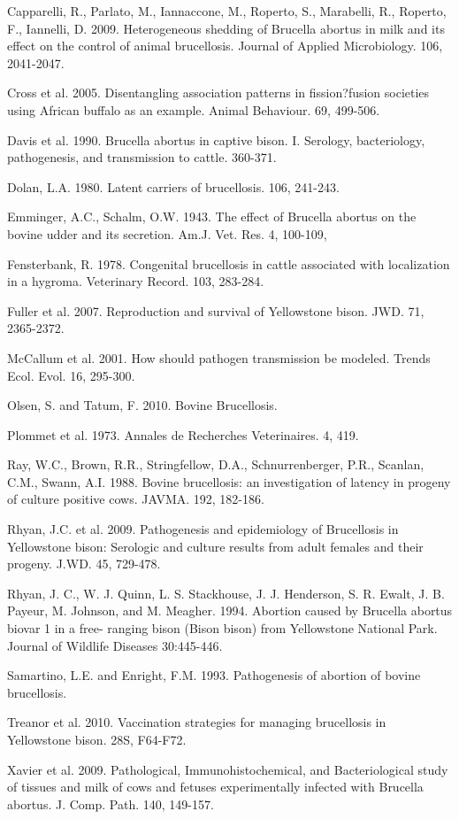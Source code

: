 \documentclass[letterpaper,12pt]{article}
\begin{document}
Capparelli, R., Parlato, M., Iannaccone, M., Roperto, S., Marabelli, R., Roperto, F., Iannelli, D. 2009. Heterogeneous shedding of Brucella abortus in milk and its effect on the control of animal brucellosis. Journal of Applied Microbiology. 106, 2041-2047.

Cross et al. 2005. Disentangling association patterns in fission?fusion societies using African buffalo as an example. Animal Behaviour. 69, 499-506.

Davis et al. 1990. Brucella abortus in captive bison. I. Serology, bacteriology, pathogenesis, and transmission to cattle. 360-371.

Dolan, L.A. 1980. Latent carriers of brucellosis. 106, 241-243. 

Emminger, A.C., Schalm, O.W. 1943. The effect of Brucella abortus on the bovine udder and its secretion. Am.J. Vet. Res. 4, 100-109, 

Fensterbank, R. 1978. Congenital brucellosis in cattle associated with localization in a hygroma. Veterinary Record. 103, 283-284.

Fuller et al. 2007. Reproduction and survival of Yellowstone bison. JWD. 71, 2365-2372.

McCallum et al. 2001. How should pathogen transmission be modeled. Trends Ecol. Evol. 16, 295-300.

Olsen, S. and Tatum, F. 2010. Bovine Brucellosis.

Plommet et al. 1973. Annales de Recherches Veterinaires. 4, 419. %

Ray, W.C., Brown, R.R., Stringfellow, D.A., Schnurrenberger, P.R., Scanlan, C.M., Swann, A.I. 1988. Bovine brucellosis: an investigation of latency in progeny of culture positive cows. JAVMA. 192, 182-186.

Rhyan, J.C. et al. 2009. Pathogenesis and epidemiology of Brucellosis in Yellowstone bison: Serologic and culture results from adult females and their progeny. J.WD. 45, 729-478.

Rhyan, J. C., W. J. Quinn, L. S. Stackhouse, J. J. Henderson, S. R. Ewalt, J. B. Payeur, M. Johnson, and M. Meagher. 1994. Abortion caused by Brucella abortus biovar 1 in a free- ranging bison (Bison bison) from Yellowstone National Park. Journal of Wildlife Diseases 30:445-446.

Samartino, L.E. and Enright, F.M. 1993. Pathogenesis of abortion of bovine brucellosis. 

Treanor et al. 2010. Vaccination strategies for managing brucellosis in Yellowstone bison. 28S, F64-F72.

Xavier et al. 2009. Pathological, Immunohistochemical, and Bacteriological study of tissues and milk of cows and fetuses experimentally infected with Brucella abortus. J. Comp. Path. 140, 149-157. 
\end{document}
